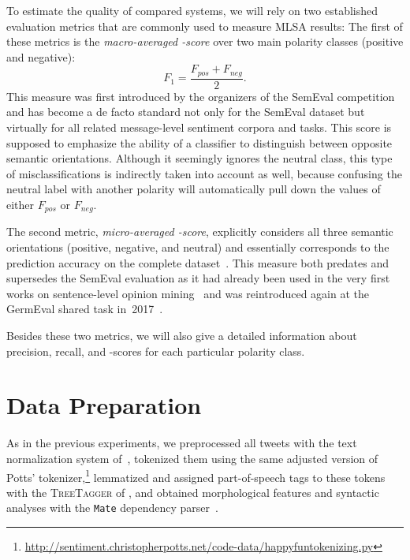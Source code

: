 To estimate the quality of compared systems, we will rely on two
established evaluation metrics that are commonly used to measure MLSA
results: The first of these metrics is the \emph{macro-averaged
  \F-score} over two main polarity classes (positive and negative):
\begin{equation*}
  F_1 = \frac{F_{pos} + F_{neg}}{2}.
\end{equation*}
This measure was first introduced by the organizers of the SemEval
competition~\cite{Nakov:13,Rosenthal:14,Rosenthal:15} and has become a
de facto standard not only for the SemEval dataset but virtually for
all related message-level sentiment corpora and tasks.  This score is
supposed to emphasize the ability of a classifier to distinguish
between opposite semantic orientations.  Although it seemingly ignores
the neutral class, this type of misclassifications is indirectly taken
into account as well, because confusing the neutral label with another
polarity will automatically pull down the values of either $F_{pos}$
or $F_{neg}$.

The second metric, \emph{micro-averaged \F-score}, explicitly
considers all three semantic orientations (positive, negative, and
neutral) and essentially corresponds to the prediction accuracy on the
complete dataset~\cite[see][p.~577]{Manning:99}.  This measure both
predates and supersedes the SemEval evaluation as it had already been
used in the very first works on sentence-level opinion
mining~\cite{Wiebe:99,Das:01,Read:05,Kennedy:06,Go:09} and was
reintroduced again at the GermEval shared task
in~2017~\cite{Wojatzki:17}.

Besides these two metrics, we will also give a detailed information
about precision, recall, and \F-scores for each particular polarity
class.

\section{Data Preparation}\label{sec:cgsa:data}

As in the previous experiments, we preprocessed all tweets with the
text normalization system of~\citet{Sidarenka:13}, tokenized them
using the same adjusted version of Potts'
tokenizer,\footnote{\url{http://sentiment.christopherpotts.net/code-data/happyfuntokenizing.py}}
lemmatized and assigned part-of-speech tags to these tokens with the
\textsc{TreeTagger} of \citet{Schmid:95}, and obtained morphological
features and syntactic analyses with the \texttt{Mate} dependency
parser~\cite{Bohnet:13}.


